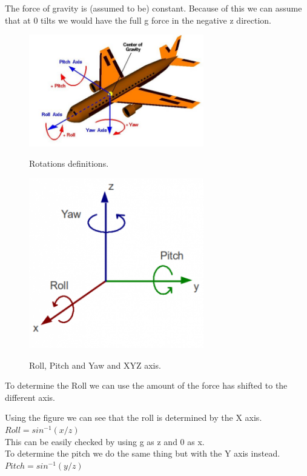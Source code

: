 \documentclass[10pt,a4paper]{article}
\begin{document}
The force of gravity is (assumed to be) constant. Because of this we can assume that at 0 tilts we would have the full g force in the negative z direction.
\begin{figure}[H]
\centering
\includegraphics[width=3in]{images/rotations.jpg} \\
\caption{Rotations definitions\cite{rotation}.}
\end{figure}
\begin{figure}[H]
\centering
\includegraphics[width=3in]{images/rollpitchyaw.png} \\
\caption{Roll, Pitch and Yaw and XYZ axis\cite{Roll}.}
\end{figure}

To determine the Roll we can use the amount of the force has shifted to the different axis.

Using the figure we can see that the roll is determined by the X axis.\\
$Roll = sin^{-1}(x/z)$\\

This can be easily checked by using g as z and 0 as x.\\


To determine the pitch we do the same thing but with the Y axis instead.\\
$Pitch = sin^{-1}(y/z)$\\
\end{document}
